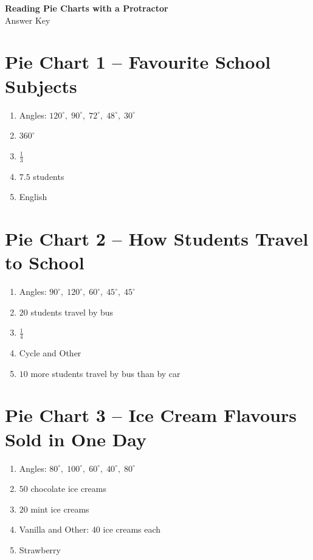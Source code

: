 \documentclass[a4paper,12pt]{article}
\begin{document}
\begin{center}
  {\LARGE\bfseries Reading Pie Charts with a Protractor}\\[3pt]
  {\large Answer Key}
\end{center}

\section*{Pie Chart 1 -- Favourite School Subjects}

\begin{enumerate}[leftmargin=1.6em, itemsep=2pt]
  \item Angles: \(120^\circ,\;90^\circ,\;72^\circ,\;48^\circ,\;30^\circ\)
  \item \(360^\circ\)
  \item \(\boxed{\frac13}\)
  \item \(7.5\) students
  \item English
\end{enumerate}

\section*{Pie Chart 2 -- How Students Travel to School}

\begin{enumerate}[leftmargin=1.6em, itemsep=2pt]
  \item Angles: \(90^\circ,\;120^\circ,\;60^\circ,\;45^\circ,\;45^\circ\)
  \item \(20\) students travel by bus
  \item \(\boxed{\frac14}\)
  \item Cycle and Other
  \item \(10\) more students travel by bus than by car
\end{enumerate}

\section*{Pie Chart 3 -- Ice Cream Flavours Sold in One Day}

\begin{enumerate}[leftmargin=1.6em, itemsep=2pt]
  \item Angles: \(80^\circ,\;100^\circ,\;60^\circ,\;40^\circ,\;80^\circ\)
  \item \(50\) chocolate ice creams
  \item \(20\) mint ice creams
  \item Vanilla and Other: \(40\) ice creams each
  \item Strawberry
\end{enumerate}
\end{document}
